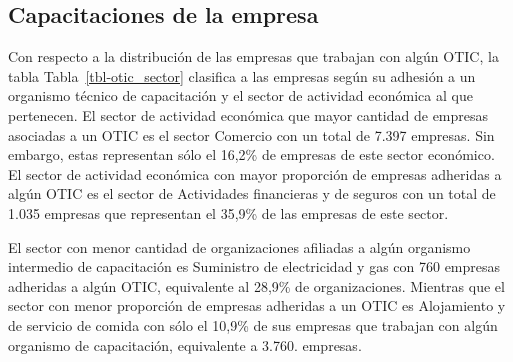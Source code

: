 \documentclass[
  11pt,
]{article}
\begin{document}
\newpage

\subsection{Capacitaciones de la
empresa}\label{capacitaciones-de-la-empresa}

Con respecto a la distribución de las empresas que trabajan con algún
OTIC, la tabla Tabla~\ref{tbl-otic_sector} clasifica a las empresas
según su adhesión a un organismo técnico de capacitación y el sector de
actividad económica al que pertenecen. El sector de actividad económica
que mayor cantidad de empresas asociadas a un OTIC es el sector Comercio
con un total de 7.397 empresas. Sin embargo, estas representan sólo el
16,2\% de empresas de este sector económico. El sector de actividad
económica con mayor proporción de empresas adheridas a algún OTIC es el
sector de Actividades financieras y de seguros con un total de 1.035
empresas que representan el 35,9\% de las empresas de este sector.

El sector con menor cantidad de organizaciones afiliadas a algún
organismo intermedio de capacitación es Suministro de electricidad y gas
con 760 empresas adheridas a algún OTIC, equivalente al 28,9\% de
organizaciones. Mientras que el sector con menor proporción de empresas
adheridas a un OTIC es Alojamiento y de servicio de comida con sólo el
10,9\% de sus empresas que trabajan con algún organismo de capacitación,
equivalente a 3.760. empresas.
\end{document}
